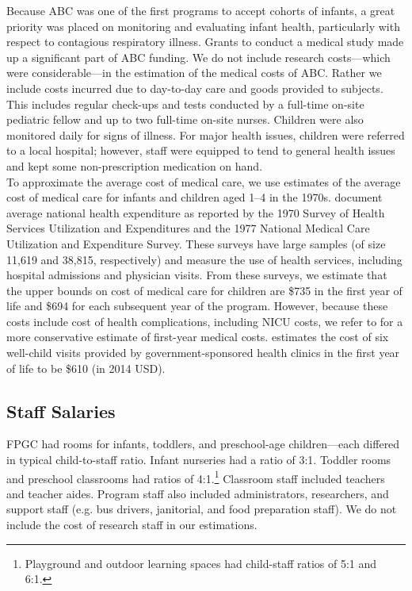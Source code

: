 \noindent Because ABC was one of the first programs to accept cohorts of infants, a great priority was placed on monitoring and evaluating infant health, particularly with respect to contagious respiratory illness. Grants to conduct a medical study made up a significant part of ABC funding. We do not include research costs---which were considerable---in the estimation of the medical costs of ABC. Rather we include costs incurred due to day-to-day care and goods provided to subjects. This includes regular check-ups and tests conducted  by a full-time on-site pediatric fellow and up to two full-time on-site nurses. Children were also monitored daily for signs of illness. For major health issues, children were referred to a local hospital; however, staff were equipped to tend to general health issues and kept some non-prescription medication on hand. \\

\noindent To approximate the average cost of medical care, we use  estimates of the average cost of medical care for infants and children aged 1--4 in the 1970s. \cite{Cutler_Meara_1998_Med-Costs_BOOK} document average national health expenditure as reported by  the 1970 Survey of Health Services  Utilization  and Expenditures and the 1977 National Medical Care Utilization  and Expenditure Survey. These surveys have large samples (of size 11,619 and 38,815, respectively) and measure the use of health services, including hospital admissions and physician visits. From these surveys, we estimate that the upper bounds on cost of medical care for children are \$735 in the first year of life and \$694 for each subsequent year of the program. However, because these costs include cost of health complications, including NICU costs, we refer to \cite{Robinson_etal_1974_FPP} for a more conservative estimate of first-year medical costs. \cite{Robinson_etal_1974_FPP} estimates the cost of six well-child visits provided by government-sponsored health clinics in the first year of life to be \$610 (in 2014 USD). \\

\subsection{Staff Salaries}
\noindent FPGC had rooms for infants, toddlers, and preschool-age children---each differed in typical child-to-staff ratio. Infant nurseries had a ratio of 3:1. Toddler rooms and preschool classrooms had ratios of 4:1.\footnote{Playground and outdoor learning spaces had child-staff ratios of 5:1 and 6:1.} Classroom staff included teachers and teacher aides. Program staff also included administrators, researchers, and support staff (e.g. bus drivers, janitorial, and food preparation staff). We do not include the cost of research staff in our estimations. \\

